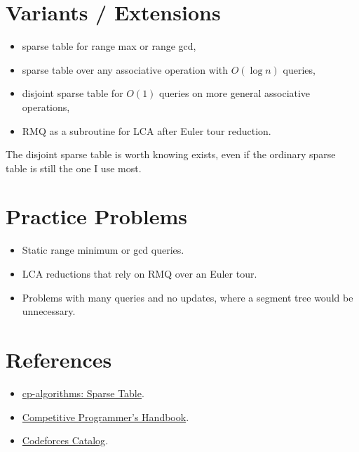\section*{Variants / Extensions}

\begin{itemize}
  \item sparse table for range max or range gcd,
  \item sparse table over any associative operation with \(O(\log n)\) queries,
  \item disjoint sparse table for \(O(1)\) queries on more general associative operations,
  \item RMQ as a subroutine for LCA after Euler tour reduction.
\end{itemize}

The disjoint sparse table is worth knowing exists, even if the ordinary sparse table is still the one I use most.

\section*{Practice Problems}

\begin{itemize}
  \item Static range minimum or gcd queries.
  \item LCA reductions that rely on RMQ over an Euler tour.
  \item Problems with many queries and no updates, where a segment tree would be unnecessary.
\end{itemize}

\section*{References}

\begin{itemize}
  \item \href{https://cp-algorithms.com/data_structures/sparse-table.html}{cp-algorithms: Sparse Table}.
  \item \href{https://usaco.guide/CPH.pdf}{Competitive Programmer's Handbook}.
  \item \href{https://codeforces.com/catalog}{Codeforces Catalog}.
\end{itemize}
